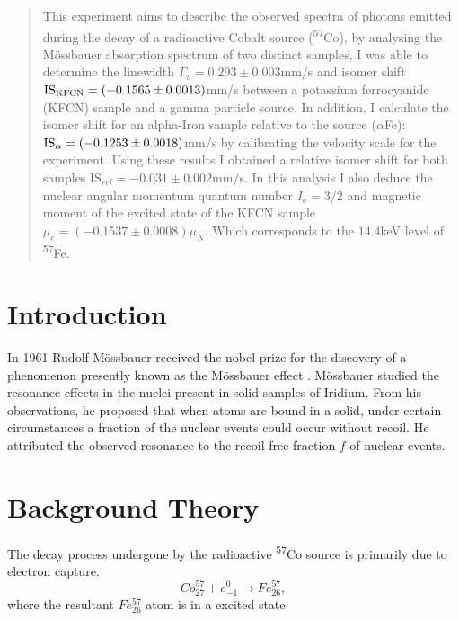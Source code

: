 \documentclass[a4paper, twocolumn]{article}
\title{
    
}
\author{Ana C. Fabela Hinojosa \\
\small{School of Physics and Astronomy, Monash University}}
\date{Last edit: \today}
\begin{document}
\maketitle

\begin{abstract}
This experiment aims to describe the observed spectra of photons emitted during the decay of a radioactive Cobalt source (\textsuperscript{57}Co),
by analysing the Mössbauer absorption spectrum of two distinct samples, I was able to determine the linewidth $\Gamma_v = 0.293\pm0.003$mm/s and isomer shift  $\textrm{IS}_{\rm KFCN} = (-0.1565\pm0.0013)$mm/s between a potassium ferrocyanide (KFCN) sample and a gamma particle source. In addition, I calculate the isomer shift for an alpha-Iron sample relative to the source ($\alpha$Fe): $\textrm{IS}_{\rm \alpha} = (-0.1253\pm0.0018)$mm/s by calibrating the velocity scale for the experiment. Using these results I obtained a relative isomer shift for both samples $\textrm{IS}_{rel} = -0.031\pm0.002$mm/s.
In this analysis I also deduce the nuclear angular momentum quantum number $I_e = 3/2$ and magnetic moment of the excited state of the KFCN sample $\mu_e = (-0.1537\pm0.0008)\mu_N$. Which corresponds to the $14.4$keV level of \textsuperscript{57}Fe.
\end{abstract}


\section{Introduction}
In 1961 Rudolf Mössbauer received the nobel prize for the discovery of a phenomenon presently known as the Mössbauer effect \cite{2}.
Mössbauer studied the resonance effects in the nuclei present in solid samples of Iridium. From his observations, he proposed that when atoms are bound in a solid, under certain circumstances a fraction of the nuclear events could occur without recoil. He attributed the observed resonance to the recoil free fraction $f$ of nuclear events\cite{0}.


\section{Background Theory}
The decay process undergone by the radioactive \textsuperscript{57}Co source is primarily due to electron capture\cite{0}.
\begin{equation} Co^{57}_{27} + e^{0}_{-1} \rightarrow Fe^{57}_{26},
\end{equation}
where the resultant $Fe^{57}_{26}$ atom is in a excited state.
\end{document}
